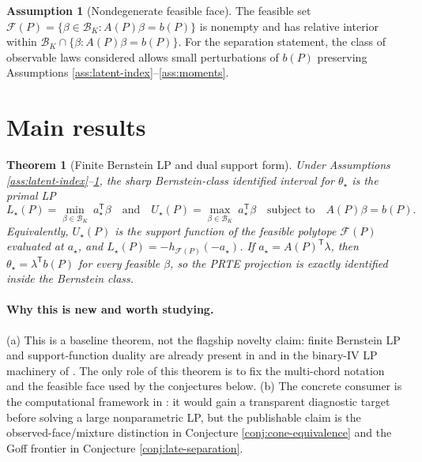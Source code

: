 \documentclass[11pt]{article}
\newcommand{\transpose}{\mathsf{T}}
\theoremstyle{definition}
\newtheorem{assumption}{Assumption}
\theoremstyle{plain}
\newtheorem{theorem}{Theorem}
\theoremstyle{remark}
\begin{document}
\begin{assumption}[Nondegenerate feasible face]\label{ass:nondegenerate}
The feasible set \(\mathcal F(P)=\{\beta\in\mathcal B_K:A(P)\beta=b(P)\}\) is nonempty and has relative interior within \(\mathcal B_K\cap\{\beta:A(P)\beta=b(P)\}\). For the separation statement, the class of observable laws considered allows small perturbations of \(b(P)\) preserving Assumptions \ref{ass:latent-index}--\ref{ass:moments}.
\end{assumption}

\section{Main results}
\begin{theorem}[Finite Bernstein LP and dual support form]\label{thm:lp-dual}
Under Assumptions \ref{ass:latent-index}--\ref{ass:nondegenerate}, the sharp Bernstein-class identified interval for \(\theta_\star\) is the primal LP
\[
L_\star(P)=\min_{\beta\in\mathcal B_K}\ a_\star^\transpose\beta\quad\text{and}\quad
U_\star(P)=\max_{\beta\in\mathcal B_K}\ a_\star^\transpose\beta
\quad\text{subject to}\quad A(P)\beta=b(P).
\]
Equivalently, \(U_\star(P)\) is the support function of the feasible polytope \(\mathcal F(P)\) evaluated at \(a_\star\), and \(L_\star(P)=-h_{\mathcal F(P)}(-a_\star)\). If \(a_\star=A(P)^\transpose\lambda\), then \(\theta_\star=\lambda^\transpose b(P)\) for every feasible \(\beta\), so the PRTE projection is exactly identified inside the Bernstein class.
\end{theorem}

\paragraph{Why this is new and worth studying.}
(a) This is a baseline theorem, not the flagship novelty claim: finite Bernstein LP and support-function duality are already present in \citet{MogstadSantosTorgovitsky2018} and in the binary-IV LP machinery of \citet{HanYang2024}. The only role of this theorem is to fix the multi-chord notation and the feasible face used by the conjectures below. (b) The concrete consumer is the computational framework in \citet{HanYang2024}: it would gain a transparent diagnostic target before solving a large nonparametric LP, but the publishable claim is the observed-face/mixture distinction in Conjecture \ref{conj:cone-equivalence} and the Goff frontier in Conjecture \ref{conj:late-separation}.
\end{document}

